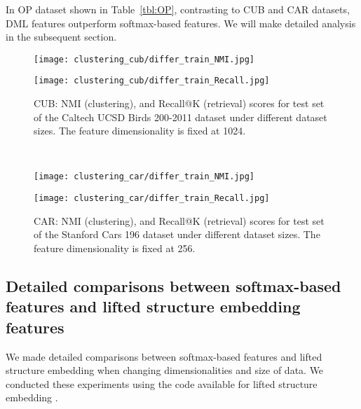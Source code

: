 \documentclass[9pt,technote,compsoc]{./sty/IEEEtran}
\newcommand{\Tref}[1]{Table~\ref{#1}}
\begin{document}
In OP dataset shown in \Tref{tbl:OP}, contrasting to CUB and CAR datasets, DML features outperform softmax-based features. We will make detailed analysis in the subsequent section.


\begin{figure*}[t!]
	\begin{minipage}{0.90\linewidth}
\hfill
		\begin{minipage}{0.45\hsize}
			\centering
			\texttt{[image: clustering\_cub/differ\_train\_NMI.jpg]}
		\end{minipage}
		\hfill
		\begin{minipage}{0.45\hsize}
			\centering
			\texttt{[image: clustering\_cub/differ\_train\_Recall.jpg]}
		\end{minipage}
		\caption{CUB: NMI (clustering), and Recall@K (retrieval) scores for test set of the Caltech UCSD Birds 200-2011 dataset under different dataset sizes. The feature dimensionality is fixed at 1024.}
		\label{fig:CUB_scale}
	\end{minipage}
	\\
	\begin{minipage}{0.90\linewidth}
\hfill
		\begin{minipage}{0.45\hsize}
			\centering
			\texttt{[image: clustering\_car/differ\_train\_NMI.jpg]}
		\end{minipage}
		\hfill
		\begin{minipage}{0.45\hsize}
			\centering
			\texttt{[image: clustering\_car/differ\_train\_Recall.jpg]}
		\end{minipage}
		\caption{CAR: NMI (clustering), and Recall@K (retrieval) scores for test set of the Stanford Cars 196 dataset under different dataset sizes. The feature dimensionality is fixed at 256.}
		\label{fig:CAR_scale}
	\end{minipage}
\end{figure*}


\subsection{Detailed comparisons between softmax-based features and lifted structure embedding features}

We made detailed comparisons between softmax-based features and lifted structure embedding \cite{song2016deep} when changing dimensionalities and size of data. We conducted these experiments using the code available for lifted structure embedding \cite{song2016deep}.
\end{document}
